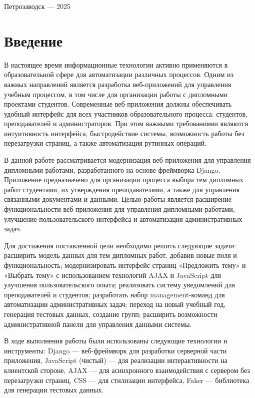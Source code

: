 \documentclass[a4paper,12pt]{article}
\begin{document}
\vfill

\begin{center}
\large
    Петрозаводск --- 2025
\end{center}


\newpage
\tableofcontents

\newpage
\section*{Введение}

В настоящее время информационные технологии активно применяются в образовательной сфере для автоматизации различных процессов. Одним из важных направлений является разработка веб-приложений для управления учебным процессом, в том числе для организации работы с дипломными проектами студентов. Современные веб-приложения должны обеспечивать удобный интерфейс для всех участников образовательного процесса: студентов, преподавателей и администраторов. При этом важными требованиями являются интуитивность интерфейса, быстродействие системы, возможность работы без перезагрузки страниц, а также автоматизация рутинных операций.

В данной работе рассматривается модернизация веб-приложения для управления дипломными работами, разработанного на основе фреймворка Django. Приложение предназначено для организации процесса выбора тем дипломных работ студентами, их утверждения преподавателями, а также для управления связанными документами и данными. Целью работы является расширение функциональности веб-приложения для управления дипломными работами, улучшение пользовательского интерфейса и автоматизация административных задач.

Для достижения поставленной цели необходимо решить следующие задачи: расширить модель данных для тем дипломных работ, добавив новые поля и функциональность; модернизировать интерфейс страниц «Предложить тему» и «Выбрать тему» с использованием технологий AJAX и JavaScript для улучшения пользовательского опыта; реализовать систему уведомлений для преподавателей и студентов; разработать набор management-команд для автоматизации административных задач: переход на новый учебный год, генерация тестовых данных, создание групп; расширить возможности административной панели для управления данными системы.

В ходе выполнения работы были использованы следующие технологии и инструменты: Django — веб-фреймворк для разработки серверной части приложения, JavaScript (чистый) — для реализации интерактивности на клиентской стороне, AJAX — для асинхронного взаимодействия с сервером без перезагрузки страниц, CSS — для стилизации интерфейса, Faker — библиотека для генерации тестовых данных.
\end{document}

